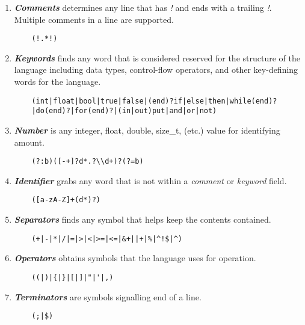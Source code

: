 \documentclass{article}
\begin{document}
    \begin{enumerate}

        \item \emph{\textbf{Comments}} determines any line that has \emph{!} and ends with a trailing \emph{!}. Multiple comments in a line are supported.
        \begin{Verbatim}
    (!.*!)
        \end{Verbatim}
        
        \item \emph{\textbf{Keywords}} finds any word that is considered reserved for the structure of the language including data types, control-flow operators, and other key-defining words for the language.  
        \begin{Verbatim}
    (int|float|bool|true|false|(end)?if|else|then|while(end)?
    |do(end)?|for(end)?|(in|out)put|and|or|not)
        \end{Verbatim}
        
        \item \emph{\textbf{Number}} is any integer, float, double, size\_t, (etc.) value for identifying amount. 
        \begin{Verbatim}
    (?:b)([-+]?d*.?\\d+)?(?=b)
        \end{Verbatim}

        \item \emph{\textbf{Identifier}} grabs any word that is not within a \emph{comment} or \emph{keyword} field.
        \begin{Verbatim}
    ([a-zA-Z]+(d*)?) 
        \end{Verbatim}
        
        \item \emph{\textbf{Separators}} finds any symbol that helps keep the contents contained.
        \begin{Verbatim}
    (+|-|*|/|=|>|<|>=|<=|&+||+|%|^!$|^)
        \end{Verbatim}
        
        \item \emph{\textbf{Operators}} obtains symbols that the language uses for operation.
        \begin{Verbatim}
    ((|)|{|}|[|]|"|'|,)
        \end{Verbatim}
       
        \item \emph{\textbf{Terminators}} are symbols signalling end of a line.
        \begin{Verbatim}
    (;|$) 
        \end{Verbatim}

    \end{enumerate}
\end{document}
